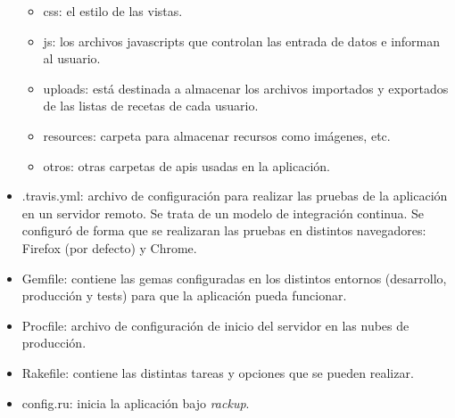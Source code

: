 \begin{itemize}
		\begin{itemize}
			\item css: el estilo de las vistas.
			\item js: los archivos javascripts que controlan las entrada de datos e informan al usuario.
			\item uploads: está destinada a almacenar los archivos importados y exportados de las listas de recetas de cada usuario.
			\item resources: carpeta para almacenar recursos como imágenes, etc.
			\item otros: otras carpetas de apis usadas en la aplicación.
		\end{itemize}
	\item .travis.yml: archivo de configuración para realizar las pruebas de la aplicación en un servidor remoto. Se trata de un modelo de integración continua. Se configuró de forma que se realizaran las pruebas en distintos navegadores: Firefox (por defecto) y Chrome.
	\item Gemfile: contiene las gemas configuradas en los distintos entornos (desarrollo, producción y tests) para que la aplicación pueda funcionar.
	\item Procfile: archivo de configuración de inicio del servidor en las nubes de producción.
	\item Rakefile: contiene las distintas tareas y opciones que se pueden realizar. 
	\item config.ru: inicia la aplicación bajo \emph{rackup}.
\end{itemize}
